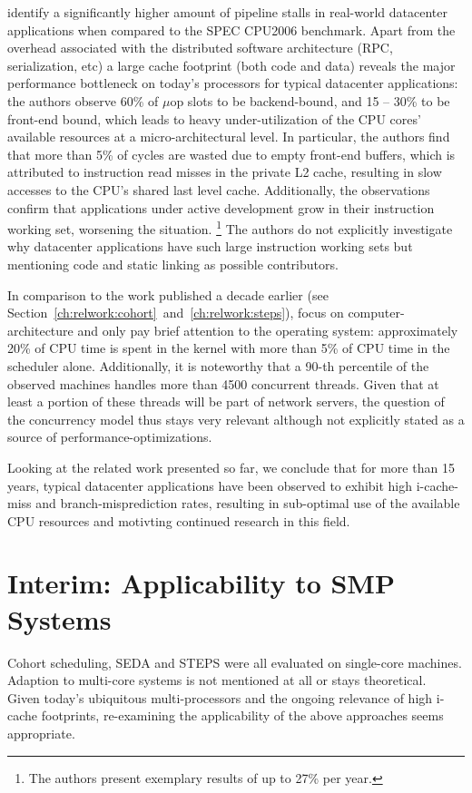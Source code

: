 \documentclass[12pt,a4paper]{book}
\begin{document}
\citeauthor*{kanev2015profiling} identify a significantly higher amount of pipeline stalls in real-world datacenter applications when compared to the SPEC CPU2006 benchmark.
Apart from the overhead associated with the distributed software architecture (RPC, serialization, etc) %
a large cache footprint (both code and data) reveals the major performance bottleneck on today's processors for typical datacenter applications:
the authors observe 60\% of $\mu$op slots to be backend-bound, and 15 -- 30\% to be front-end bound, which leads to heavy under-utilization of the CPU cores' available resources at a micro-architectural level.
In particular, the authors find that more than 5\% of cycles are wasted due to empty front-end buffers, which is attributed to instruction read misses in the private L2 cache, resulting in slow accesses to the CPU's shared last level cache.
Additionally, the observations confirm that applications under active development grow in their instruction working set, worsening the situation.%
\footnote{The authors present exemplary results of up to 27\% per year.}
The authors do not explicitly investigate why datacenter applications have such large instruction working sets but mentioning  code and static linking as possible contributors.~\cite{kanev2015profiling}

In comparison to the work published a decade earlier (see Section~\ref{ch:relwork:cohort}~and~\ref{ch:relwork:steps}),
\citeauthor*{kanev2015profiling} focus on computer-architecture and only pay brief attention to the operating system:
approximately 20\% of CPU time is spent in the kernel with more than 5\% of CPU time in the scheduler alone.
Additionally, it is noteworthy that a 90-th percentile of the observed machines handles more than 4500 concurrent threads.
Given that at least a portion of these threads will be part of network servers, the question of the concurrency model thus stays very relevant although not explicitly stated as a source of performance-optimizations.~\cite{kanev2015profiling}

Looking at the related work presented so far, we conclude that for more than 15 years, typical datacenter applications have been observed to exhibit high i-cache-miss and branch-misprediction rates, resulting in sub-optimal use of the available CPU resources and motivting continued research in this field.

\section{Interim: Applicability to SMP Systems}\label{ch:relwork:anasmp}
Cohort scheduling, SEDA and STEPS were all evaluated on single-core machines.
Adaption to multi-core systems is not mentioned at all or stays theoretical.~\cite{steps,harizopoulos2003case}
Given today's ubiquitous multi-processors and the ongoing relevance of high i-cache footprints, re-examining the applicability of the above approaches seems appropriate.
\end{document}
